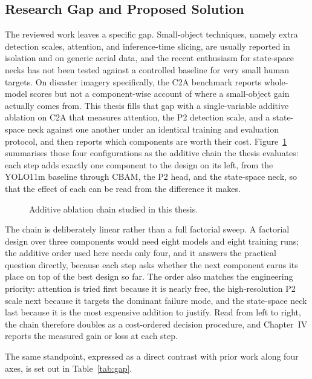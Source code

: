 \subsection{Research Gap and Proposed Solution}
The reviewed work leaves a specific gap. Small-object techniques, namely extra
detection scales, attention, and inference-time slicing, are usually reported in
isolation and on generic aerial data, and the recent enthusiasm for state-space
necks has not been tested against a controlled baseline for very small human
targets. On disaster imagery specifically, the C2A benchmark reports whole-model
scores but not a component-wise account of where a small-object gain actually comes
from. This thesis fills that gap with a single-variable additive ablation on C2A
that measures attention, the P2 detection scale, and a state-space neck against one
another under an identical training and evaluation protocol, and then reports which
components are worth their cost. Figure~\ref{fig:chain} summarises those four
configurations as the additive chain the thesis evaluates: each step adds
exactly one component to the design on its left, from the YOLO11m baseline
through CBAM, the P2 head, and the state-space neck, so that the effect of each
can be read from the difference it makes.

\begin{figure}[H]
  \centering
  \caption{Additive ablation chain studied in this thesis.}
  \label{fig:chain}
\end{figure}

The chain is deliberately linear rather than a full factorial sweep. A
factorial design over three components would need eight models and eight
training runs; the additive order used here needs only four, and it answers the
practical question directly, because each step asks whether the next component
earns its place on top of the best design so far. The order also matches the
engineering priority: attention is tried first because it is nearly free, the
high-resolution P2 scale next because it targets the dominant failure mode, and
the state-space neck last because it is the most expensive addition to justify.
Read from left to right, the chain therefore doubles as a cost-ordered decision
procedure, and Chapter~IV reports the measured gain or loss at each step.

The same standpoint, expressed as a direct contrast with prior work along four
axes, is set out in Table~\ref{tab:gap}.

